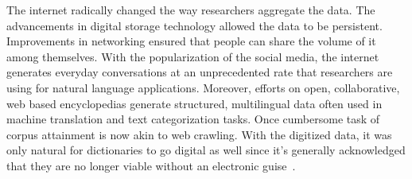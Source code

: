 The internet radically changed the way researchers aggregate the data.
The advancements in digital storage technology allowed the data to be persistent.
Improvements in networking ensured that people can share the volume of it among themselves.
With the popularization of the social media, the internet generates everyday conversations at an unprecedented rate that researchers are using for natural language applications. %
Moreover,  efforts on open, collaborative, web based encyclopedias generate structured, multilingual data often used in machine translation and text categorization tasks. %
Once cumbersome task of corpus attainment is now akin to web crawling.
With the digitized data, it was only natural for dictionaries to go digital as well since it's generally acknowledged that they are no longer viable without an electronic guise~\cite{sterkenburg_practical_2003}.

